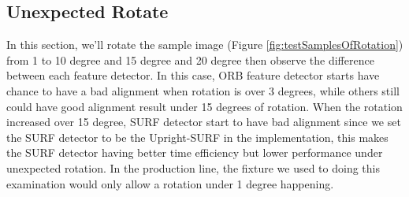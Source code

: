	\subsection{Unexpected Rotate}
		In this section, we'll rotate the sample image (Figure \ref{fig:testSamplesOfRotation}) from 1 to 10 degree and 15 degree and 20 degree then observe the difference between each feature detector. 
		In this case, ORB feature detector starts have chance to have a bad alignment when rotation is over 3 degrees, while others still could have good alignment result under 15 degrees of rotation. 
		When the rotation increased over 15 degree, SURF detector start to have bad alignment since we set the SURF detector to be the Upright-SURF in the implementation, this makes the SURF detector having better time efficiency but lower performance under unexpected rotation.
		In the production line, the fixture we used to doing this examination would only allow a rotation under 1 degree happening.
